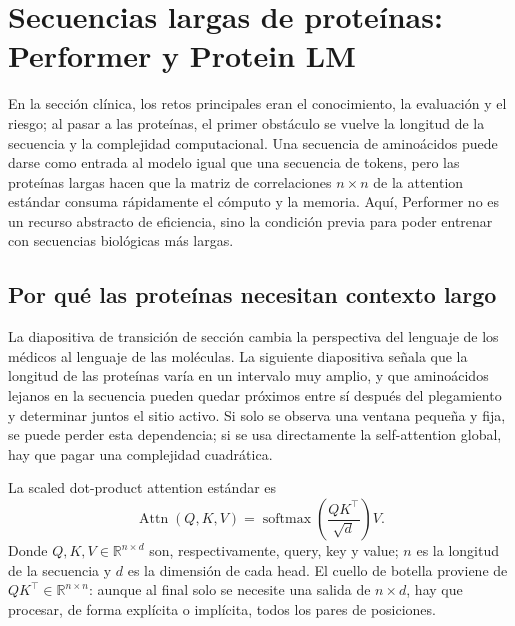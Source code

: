 \section{Secuencias largas de proteínas: Performer y Protein LM}

En la sección clínica, los retos principales eran el conocimiento, la evaluación y el riesgo; al pasar a las proteínas, el primer obstáculo se vuelve la longitud de la secuencia y la complejidad computacional. Una secuencia de aminoácidos puede darse como entrada al modelo igual que una secuencia de tokens, pero las proteínas largas hacen que la matriz de correlaciones $n\times n$ de la attention estándar consuma rápidamente el cómputo y la memoria. Aquí, Performer no es un recurso abstracto de eficiencia, sino la condición previa para poder entrenar con secuencias biológicas más largas.

\subsection{Por qué las proteínas necesitan contexto largo}

La diapositiva de transición de sección cambia la perspectiva del lenguaje de los médicos al lenguaje de las moléculas. La siguiente diapositiva señala que la longitud de las proteínas varía en un intervalo muy amplio, y que aminoácidos lejanos en la secuencia pueden quedar próximos entre sí después del plegamiento y determinar juntos el sitio activo. Si solo se observa una ventana pequeña y fija, se puede perder esta dependencia; si se usa directamente la self-attention global, hay que pagar una complejidad cuadrática.



La scaled dot-product attention estándar es
$$
\operatorname{Attn}(Q,K,V)=
\operatorname{softmax}\!\left(\frac{QK^{\top}}{\sqrt d}\right)V.
$$
Donde $Q,K,V\in\mathbb{R}^{n\times d}$ son, respectivamente, query, key y value; $n$ es la longitud de la secuencia y $d$ es la dimensión de cada head. El cuello de botella proviene de $QK^{\top}\in\mathbb{R}^{n\times n}$: aunque al final solo se necesite una salida de $n\times d$, hay que procesar, de forma explícita o implícita, todos los pares de posiciones.

